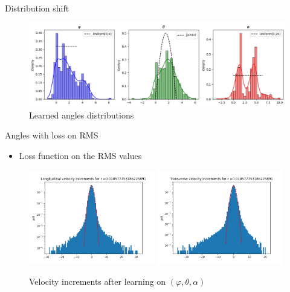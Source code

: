 \documentclass[11pt]{beamer}
\begin{document}
\begin{frame}{Distribution shift}
    \begin{figure}
        \centering
        \includegraphics[width=1\linewidth]{illustrations/AnglesDistributionLearned.png}
        \caption{Learned angles distributions}
    \end{figure}
\end{frame}

\begin{frame}{Angles with loss on RMS}
  \begin{itemize}
    \item Loss function on the RMS values
  \end{itemize}
  \begin{figure}
    \centering
    \includegraphics[width=0.49\textwidth]{illustrations/VelIncrAnglesRMS4.1.png}
    \includegraphics[width=0.49\textwidth]{illustrations/VelIncrAnglesRMS4.2.png}
    \caption{Velocity increments after learning on $(\varphi,\theta,\alpha)$}
  \end{figure}
\end{frame}
\end{document}

